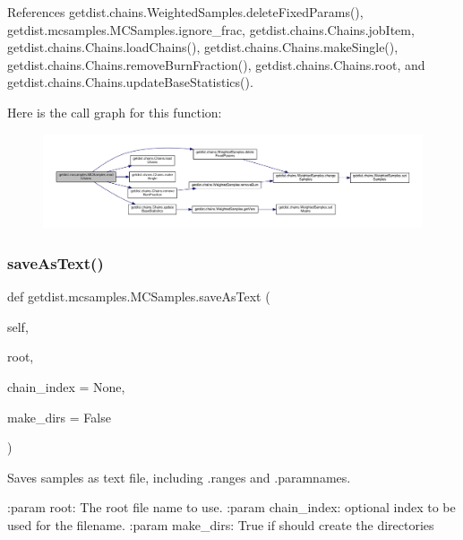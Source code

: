 References getdist.\+chains.\+Weighted\+Samples.\+delete\+Fixed\+Params(), getdist.\+mcsamples.\+M\+C\+Samples.\+ignore\+\_\+frac, getdist.\+chains.\+Chains.\+job\+Item, getdist.\+chains.\+Chains.\+load\+Chains(), getdist.\+chains.\+Chains.\+make\+Single(), getdist.\+chains.\+Chains.\+remove\+Burn\+Fraction(), getdist.\+chains.\+Chains.\+root, and getdist.\+chains.\+Chains.\+update\+Base\+Statistics().

Here is the call graph for this function\+:
\nopagebreak
\begin{figure}[H]
\begin{center}
\leavevmode
\includegraphics[width=350pt]{classgetdist_1_1mcsamples_1_1MCSamples_a4573e1e3c4919d77f2c9552d8e3f6ab0_cgraph}
\end{center}
\end{figure}
\mbox{\label{classgetdist_1_1mcsamples_1_1MCSamples_af250b2532a15a5c4000b56f54598c3ce}} 
\subsubsection{\texorpdfstring{save\+As\+Text()}{saveAsText()}}
{\footnotesize\ttfamily def getdist.\+mcsamples.\+M\+C\+Samples.\+save\+As\+Text (\begin{DoxyParamCaption}\item[{}]{self,  }\item[{}]{root,  }\item[{}]{chain\+\_\+index = {\ttfamily None},  }\item[{}]{make\+\_\+dirs = {\ttfamily False} }\end{DoxyParamCaption})}

\begin{DoxyVerb}Saves samples as text file, including .ranges and .paramnames.

:param root: The root file name to use.
:param chain_index: optional index to be used for the filename.
:param make_dirs: True if should create the directories
\end{DoxyVerb}
 

